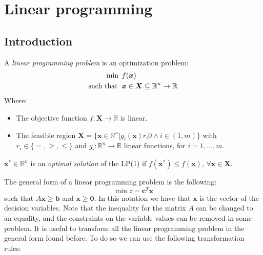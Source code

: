 \documentclass[12pt, a4paper]{report}
\begin{document}
    \newpage 

    \chapter{Linear programming}
    \section{Introduction}
    \begin{definition}
        A \emph{linear programming problem} is an optimization problem: 
        \begin{align*}
            \min                      \:&\:f(\boldsymbol{x})           \\
            \textnormal{such that }     &\: \boldsymbol{x} \in \boldsymbol{X} \subseteq \mathbb{R}^n \rightarrow \mathbb{R} 
        \end{align*}
        Where: 
        \begin{itemize}
            \item The objective function $f:\boldsymbol{X} \rightarrow \mathbb{R}$ is linear. 
            \item The feasible region $\boldsymbol{X}=\{\boldsymbol{x} \in \mathbb{R}^n|g_i(\boldsymbol{x})r_i0 \land i \in (1,m)\}$ with $r_i \in \{=,\geq,\leq\}$ and 
            $g_i:\mathbb{R}^n \rightarrow \mathbb{R}$ linear functions, for $i=1,\dots,m$.
        \end{itemize}

        $\boldsymbol{x}^{*} \in \mathbb{R}^n$ is an \emph{optimal solution} of the LP(1) if $f(\boldsymbol{x}^{*}) \leq f(\boldsymbol{x})$, $\forall \boldsymbol{x} \in \boldsymbol{X}$. 
    \end{definition}
    The general form of a linear programming problem is the following: 
    \[\min{z}=\boldsymbol{c}^T\boldsymbol{x}\]
    such that $A\boldsymbol{x} \geq \boldsymbol{b}$ and $\boldsymbol{x} \geq \boldsymbol{0}$. In this notation we have that $\boldsymbol{x}$
    is the vector of the decision variables. Note that the inequality for the matrix $A$ can be changed to an equality, and the 
    constraints on the variable values can be removed in some problem. It is useful to transform all the linear programming problem in the 
    general form found before. To do so we can use the following transformation rules: 
\end{document}
